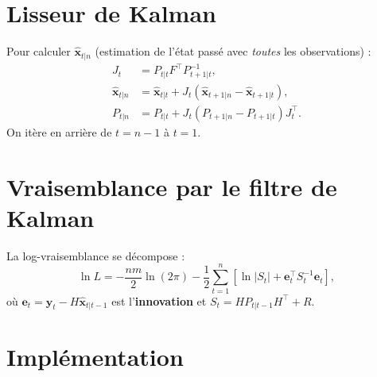 \section{Lisseur de Kalman}

\begin{definition}
Pour calculer $\hat{\bm{x}}_{t|n}$ (estimation de l'\'etat pass\'e avec \emph{toutes} les observations) :
\begin{align}
J_t &= P_{t|t}F^\top P_{t+1|t}^{-1}, \\
\hat{\bm{x}}_{t|n} &= \hat{\bm{x}}_{t|t} + J_t(\hat{\bm{x}}_{t+1|n}-\hat{\bm{x}}_{t+1|t}), \\
P_{t|n} &= P_{t|t} + J_t(P_{t+1|n}-P_{t+1|t})J_t^\top.
\end{align}
On it\`ere en arri\`ere de $t=n-1$ \`a $t=1$.
\end{definition}

\section{Vraisemblance par le filtre de Kalman}

\begin{theoreme}
La log-vraisemblance se d\'ecompose :
\[
\ln L = -\frac{nm}{2}\ln(2\pi) - \frac{1}{2}\sum_{t=1}^n\left[\ln|S_t| + \bm{e}_t^\top S_t^{-1}\bm{e}_t\right],
\]
o\`u $\bm{e}_t = \bm{y}_t-H\hat{\bm{x}}_{t|t-1}$ est l'\textbf{innovation} et $S_t = HP_{t|t-1}H^\top+R$.
\end{theoreme}

\section{Impl\'ementation}


